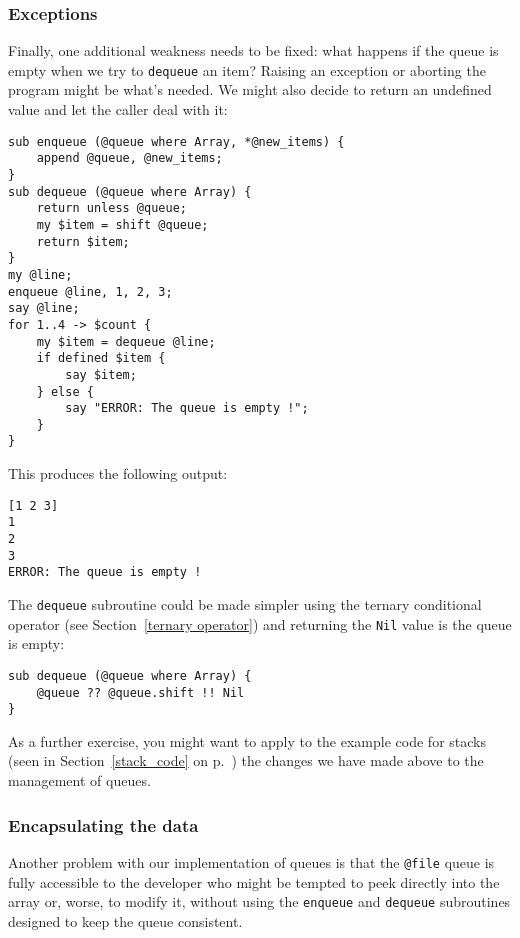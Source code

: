 \subsubsection{Exceptions}

Finally, one additional weakness needs to be fixed: what 
happens if the queue is empty when we try to {\tt dequeue} 
an item? Raising an exception or aborting the program 
might be what's needed. We might also decide to return an 
undefined value and let the caller deal with it:

\begin{verbatim}
sub enqueue (@queue where Array, *@new_items) {
    append @queue, @new_items;
}
sub dequeue (@queue where Array) {
    return unless @queue;
    my $item = shift @queue;
    return $item;
}
my @line;
enqueue @line, 1, 2, 3;
say @line;
for 1..4 -> $count {
    my $item = dequeue @line;
    if defined $item {
        say $item;
    } else {
        say "ERROR: The queue is empty !";
    }
}
\end{verbatim}

This produces the following output:

\begin{verbatim}
[1 2 3]
1
2
3
ERROR: The queue is empty !
\end{verbatim}

The {\tt dequeue} subroutine could be made simpler using 
the ternary conditional operator (see 
Section~\ref{ternary operator}) and returning the {\tt Nil} 
value is the queue is empty:

\begin{verbatim}
sub dequeue (@queue where Array) {
    @queue ?? @queue.shift !! Nil
}
\end{verbatim}


As a further exercise, you might want to apply to the 
example code for stacks (seen in Section~\ref{stack_code} 
on p.~\pageref{stack_code}) the changes we have made 
above to the management of queues.

\subsubsection{Encapsulating the data}
\label{functional_queue}

Another problem with our implementation of queues is that 
the \verb'@file' queue is fully accessible to the developer 
who might be tempted to peek directly into the array or, 
worse, to modify it, without using the {\tt enqueue} and 
{\tt dequeue} subroutines designed to keep the queue 
consistent. 

